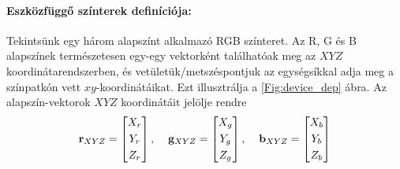 \paragraph{Eszközfüggő színterek definíciója:\\}

Tekintsünk egy három alapszínt alkalmazó RGB színteret.
Az R, G és B alapszínek természetesen egy-egy vektorként találhatóak meg az $XYZ$ koordinátarendszerben, és vetületük/metszéspontjuk az egységsíkkal adja meg a színpatkón vett $xy$-koordinátáikat.
Ezt illusztrálja a \ref{Fig:device_dep} ábra.
Az alapszín-vektorok $XYZ$ koordinátáit jelölje rendre 
\begin{equation}
\mathbf{r}_{XYZ} = \begin{bmatrix}
       X_r \\[0.3em]
       Y_r \\[0.3em]
       Z_r \end{bmatrix}, \hspace{4mm}
\mathbf{g}_{XYZ} = \begin{bmatrix}
       X_g \\[0.3em]
       Y_g \\[0.3em]
       Z_g \end{bmatrix}, \hspace{4mm}
\mathbf{b}_{XYZ} = \begin{bmatrix}
       X_b \\[0.3em]
       Y_b \\[0.3em]
       Z_b \end{bmatrix}
\end{equation}

